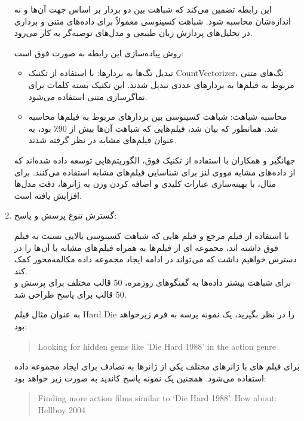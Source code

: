 \begin{enumerate}
این رابطه تضمین می‌کند که شباهت بین دو بردار بر اساس جهت آن‌ها و نه اندازه‌شان محاسبه شود. شباهت کسینوسی معمولاً برای داده‌های متنی و برداری در تحلیل‌های پردازش زبان طبیعی و مدل‌های توصیه‌گر به کار می‌رود.

روش پیاده‌سازی این رابطه به صورت فوق است:
\begin{itemize}
\item
تبدیل تگ‌ها به بردارها: با استفاده از تکنیک CountVectorizer، تگ‌های متنی مربوط به فیلم‌ها به بردارهای عددی تبدیل شدند. این تکنیک بسته کلمات%
 برای نماگر‌سازی متنی استفاده می‌شود.
\item
محاسبه شباهت: شباهت کسینوسی بین بردارهای مربوط به فیلم‌ها محاسبه شد. همانطور که بیان شد، فیلم‌هایی که شباهت آن‌ها بیش از 90٪ بود، به عنوان فیلم‌های مشابه در نظر گرفته شدند.
\end{itemize}

جهانگیر و همکاران%
\cite{singh2020movie}
 با استفاده از تکنیک فوق، الگوریتم‌هایی توسعه داده شده‌اند که از داده‌های مشابه مووی لنز برای شناسایی فیلم‌های مشابه استفاده می‌کنند. برای مثال، با بهینه‌سازی عبارات کلیدی و اضافه کردن وزن به ژانرها، دقت مدل‌ها افزایش یافته است.


\item
گسترش تنوع پرسش و پاسخ:

با استفاده از فیلم مرجع و فیلم هایی که شباهت کسینوسی بالایی نسبت به فیلم فوق داشته اند، مجموعه ای از فیلم ها به همراه فیلم های مشابه با آن ها را در دسترس خواهیم داشت که می تواند در ادامه ایجاد مجموعه داده مکالمه‌محور کمک کند.\\
برای شباهت بیشتر داده‌ها به گفتگوهای روزمره، 50 قالب مختلف برای پرسش و 50 قالب برای پاسخ طراحی شد.


به عنوان مثال فیلم Hard Die را در نظر بگیرید، یک نمونه پرسه به فرم زیرخواهد بود:
\begin{quote}
\begin{LTR}
Looking for hidden gems like 'Die Hard 1988' in the action genre
\end{LTR}
\end{quote}

برای فیلم های با ژانرهای مختلف یکی از ژانرها به تصادف برای ایجاد مجموعه داده استفاده می‌شود.
همچنین یک نمونه پاسخ کاندید به صورت زیر خواهد بود:
\begin{quote}
\begin{LTR}
Finding more action films similar to ‘Die Hard 1988'. How about: Hellboy 2004
\end{LTR}
\end{quote}



\end{enumerate}
